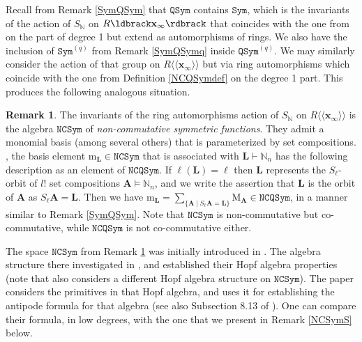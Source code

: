 \documentclass{article}
\theoremstyle{definition}
\newtheorem{rmk}[thm]{Remark}
\begin{document}
Recall from Remark \ref{SymQSym} that $\mathtt{QSym}$ contains $\mathtt{Sym}$, which is the invariants of the action of $S_{\mathbb{N}}$ on $R\ldbrack\mathbf{x}_{\infty}\rdbrack$ that coincides with the one from \cite{[Hi2]} on the part of degree 1 but extend as automorphisms of rings. We also have the inclusion of $\mathtt{Sym}^{(q)}$ from Remark \ref{SymQSymq} inside $\mathtt{QSym}^{(q)}$. We may similarly consider the action of that group on $R\langle\langle\mathbf{x}_{\infty}\rangle\rangle$ but via ring automorphisms which coincide with the one from Definition \ref{NCQSymdef} on the degree 1 part. This produces the following analogous situation.
\begin{rmk}
The invariants of the ring automorphisms action of $S_{\mathbb{N}}$ on $R\langle\langle\mathbf{x}_{\infty}\rangle\rangle$ is the algebra $\mathtt{NCSym}$ of \emph{non-commutative symmetric functions}. They admit a monomial basis (among several others) that is parameterized by set compositions. , the basis element $\mathrm{m}_{\mathbf{L}}\in\mathtt{NCSym}$ that is associated with $\mathbf{L}\vdash\mathbb{N}_{n}$ has the following description as an element of $\mathtt{NCQSym}$. If $\ell(\mathbf{L})=\ell$ then $\mathbf{L}$ represents the $S_{\ell}$-orbit of $l!$ set compositions $\mathbf{A}\vDash\mathbb{N}_{n}$, and we write the assertion that $\mathbf{L}$ is the orbit of $\mathbf{A}$ as $S_{\ell}\mathbf{A}=\mathbf{L}$. Then we have $\mathrm{m}_{\mathbf{L}}=\sum_{\{\mathbf{A}\;|\;S_{\ell}\mathbf{A}=\mathbf{L}\}}\mathrm{M}_{\mathbf{A}}\in\mathtt{NCQSym}$, in a manner similar to Remark \ref{SymQSym}. Note that $\mathtt{NCSym}$ is non-commutative but co-commutative, while $\mathtt{NCQSym}$ is not co-commutative either. \label{NCSym}
\end{rmk}
The space $\mathtt{NCSym}$ from Remark \ref{NCSym} was initially introduced in \cite{[W]}. The algebra structure there investigated in \cite{[RS]}, and \cite{[BRRZ]} established their Hopf algebra properties (note that \cite{[BHRZ]} also considers a different Hopf algebra structure on $\mathtt{NCSym}$). The paper \cite{[LM]} considers the primitives in that Hopf algebra, and uses it for establishing the antipode formula for that algebra (see also Subsection 8.13 of \cite{[D]}). One can compare their formula, in low degrees, with the one that we present in Remark \ref{NCSymS} below.

\medskip
\end{document}
